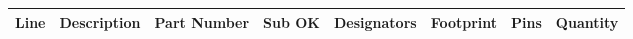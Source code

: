 \documentclass{article}
\begin{document}


\begin{center}
    \begin{longtable}{| r | p{4.7cm} | p{3.8cm} | l | p{3.8cm} | l | r | r |}
    \hline
	\multicolumn{1}{|l|}{\textbf{Line}} & \multicolumn{1}{l|}{\textbf{Description}} & \multicolumn{1}{l|}{\textbf{Part Number}} & \multicolumn{1}{l|}{\textbf{Sub OK}} & \multicolumn{1}{l|}{\textbf{Designators}} & \multicolumn{1}{l|}{\textbf{Footprint}} & \multicolumn{1}{r|}{\textbf{Pins}} & \multicolumn{1}{r|}{\textbf{Quantity}} \\ \hline	 
	\endhead
	
    \end{longtable}
\end{center}

\end{document}
